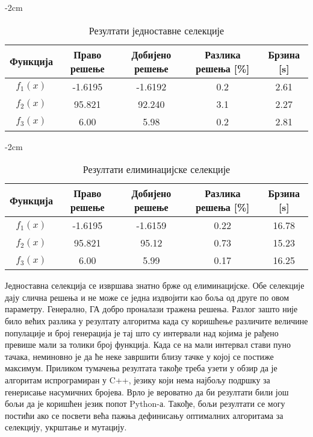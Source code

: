 \documentclass{article}
\begin{document}
\begin{table}[H]
    \centering
    \addtolength{\leftskip} {-2cm}
    \addtolength{\rightskip}{-2cm}
    \begin{tabular}{ |c|c|c|c|c| } 
        \hline
        \textbf{Функција} & \textbf{Право решење} & \textbf{Добијено решење} & \textbf{Разлика решења [\%]} & \textbf{Брзина [s]} \\ 
        \hline
        $f_1(x)$ & -1.6195 & -1.6192 & 0.2 & 2.61 \\ 
        \hline                     
        $f_2(x)$ & 95.821 & 92.240 & 3.1 & 2.27 \\ 
        \hline                     
        $f_3(x)$ & 6.00 & 5.98 & 0.2 & 2.81 \\ 
        \hline                     
    \end{tabular}
    \caption{Резултати једноставне селекције}
\end{table}

\begin{table}[H]
    \centering
    \addtolength{\leftskip} {-2cm}
    \addtolength{\rightskip}{-2cm}
    \begin{tabular}{ |c|c|c|c|c| } 
        \hline
        \textbf{Функција} & \textbf{Право решење} & \textbf{Добијено решење} & \textbf{Разлика решења [\%]} & \textbf{Брзина [s]} \\ 
        \hline
        $f_1(x)$ & -1.6195 & -1.6159 & 0.22 & 16.78 \\ 
        \hline                     
        $f_2(x)$ & 95.821 & 95.12 & 0.73 & 15.23 \\ 
        \hline                     
        $f_3(x)$ & 6.00 & 5.99 & 0.17 & 16.25 \\ 
        \hline                     
    \end{tabular}
    \caption{Резултати елиминацијске селекције}
\end{table}

Једноставна селекција се извршава знатно брже од елиминацијске. Обе селекције дају слична решења 
и не може се једна издвојити као боља од друге по овом параметру. Генерално, ГА добро проналази тражена решења.
Разлог зашто није било већих разлика у резултату алгоритма када су коришћење различите величине популације и 
број генерација је тај што су интервали над којима је рађено превише мали за толики број функција. Када се на 
мали интервал стави пуно тачака, неминовно је да ће неке завршити близу тачке у којој се постиже максимум.
Приликом тумачења резултата такође треба узети у обзир да је алгоритам испрограмиран у C++, језику који нема 
најбољу подршку за генерисање насумичних бројева. Врло је вероватно да би резултати били још бољи да 
је коришћен језик попот Python-а. Такође, бољи резултати се могу постићи ако се посвети већа пажња дефинисању
оптималних алгоритама за селекцију, укрштање и мутацију.
\end{document}
